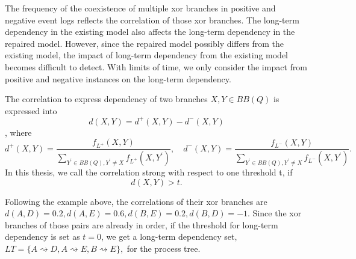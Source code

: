 The frequency of the coexistence of multiple xor branches in positive and negative event logs reflects the correlation of those xor branches. The long-term dependency in the existing model also affects the long-term dependency in the repaired model. However, since the repaired model possibly differs from the existing model, the impact of long-term dependency from the existing model becomes difficult to detect. With limits of time, we only consider the impact from positive and negative instances on the long-term dependency.
\begin{definition} The correlation to express dependency of two branches $X,Y \in BB(Q)$ is expressed into
	\[d(X,Y)=  d^{+}(X, Y) -d^{-}(X, Y)\], where 
	\[d^{+}(X, Y)= \frac{f_{L^+}(X, Y)}{\sum_{Y^\prime \in BB(Q), Y^\prime \neq X} f_{L^+}(X, Y^\prime)}, \quad d^{-}(X, Y)= \frac{f_{L^-}(X, Y)}{\sum_{Y^\prime \in BB(Q), Y^\prime \neq X} f_{L^-}(X, Y^\prime)}.\]
In this thesis, we call the correlation strong with respect to one threshold t, if 
\[d(X,Y) > t.\]	
\end{definition}
Following the example above, the correlations of their xor branches are $d(A, D)=0.2,  d(A, E)=0.6, d(B, E)=0.2, d(B, D)=-1$. Since the xor branches of those pairs are already in order, if the threshold for long-term dependency is set as $t=0$, we get a long-term dependency set, $LT=\{ A\rightsquigarrow D, A\rightsquigarrow E, B\rightsquigarrow E\},$ for the process tree.   
